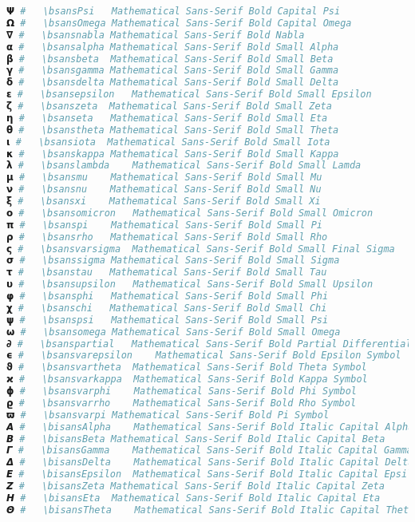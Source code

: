 \begin{lstlisting}[language=Julia, style=julia]
𝝭 #   \bsansPsi   Mathematical Sans-Serif Bold Capital Psi
𝝮 #   \bsansOmega Mathematical Sans-Serif Bold Capital Omega
𝝯 #   \bsansnabla Mathematical Sans-Serif Bold Nabla
𝝰 #   \bsansalpha Mathematical Sans-Serif Bold Small Alpha
𝝱 #   \bsansbeta  Mathematical Sans-Serif Bold Small Beta
𝝲 #   \bsansgamma Mathematical Sans-Serif Bold Small Gamma
𝝳 #   \bsansdelta Mathematical Sans-Serif Bold Small Delta
𝝴 #   \bsansepsilon   Mathematical Sans-Serif Bold Small Epsilon
𝝵 #   \bsanszeta  Mathematical Sans-Serif Bold Small Zeta
𝝶 #   \bsanseta   Mathematical Sans-Serif Bold Small Eta
𝝷 #   \bsanstheta Mathematical Sans-Serif Bold Small Theta
𝝸 #   \bsansiota  Mathematical Sans-Serif Bold Small Iota
𝝹 #   \bsanskappa Mathematical Sans-Serif Bold Small Kappa
𝝺 #   \bsanslambda    Mathematical Sans-Serif Bold Small Lamda
𝝻 #   \bsansmu    Mathematical Sans-Serif Bold Small Mu
𝝼 #   \bsansnu    Mathematical Sans-Serif Bold Small Nu
𝝽 #   \bsansxi    Mathematical Sans-Serif Bold Small Xi
𝝾 #   \bsansomicron   Mathematical Sans-Serif Bold Small Omicron
𝝿 #   \bsanspi    Mathematical Sans-Serif Bold Small Pi
𝞀 #   \bsansrho   Mathematical Sans-Serif Bold Small Rho
𝞁 #   \bsansvarsigma  Mathematical Sans-Serif Bold Small Final Sigma
𝞂 #   \bsanssigma Mathematical Sans-Serif Bold Small Sigma
𝞃 #   \bsanstau   Mathematical Sans-Serif Bold Small Tau
𝞄 #   \bsansupsilon   Mathematical Sans-Serif Bold Small Upsilon
𝞅 #   \bsansphi   Mathematical Sans-Serif Bold Small Phi
𝞆 #   \bsanschi   Mathematical Sans-Serif Bold Small Chi
𝞇 #   \bsanspsi   Mathematical Sans-Serif Bold Small Psi
𝞈 #   \bsansomega Mathematical Sans-Serif Bold Small Omega
𝞉 #   \bsanspartial   Mathematical Sans-Serif Bold Partial Differential
𝞊 #   \bsansvarepsilon    Mathematical Sans-Serif Bold Epsilon Symbol
𝞋 #   \bsansvartheta  Mathematical Sans-Serif Bold Theta Symbol
𝞌 #   \bsansvarkappa  Mathematical Sans-Serif Bold Kappa Symbol
𝞍 #   \bsansvarphi    Mathematical Sans-Serif Bold Phi Symbol
𝞎 #   \bsansvarrho    Mathematical Sans-Serif Bold Rho Symbol
𝞏 #   \bsansvarpi Mathematical Sans-Serif Bold Pi Symbol
𝞐 #   \bisansAlpha    Mathematical Sans-Serif Bold Italic Capital Alpha
𝞑 #   \bisansBeta Mathematical Sans-Serif Bold Italic Capital Beta
𝞒 #   \bisansGamma    Mathematical Sans-Serif Bold Italic Capital Gamma
𝞓 #   \bisansDelta    Mathematical Sans-Serif Bold Italic Capital Delta
𝞔 #   \bisansEpsilon  Mathematical Sans-Serif Bold Italic Capital Epsilon
𝞕 #   \bisansZeta Mathematical Sans-Serif Bold Italic Capital Zeta
𝞖 #   \bisansEta  Mathematical Sans-Serif Bold Italic Capital Eta
𝞗 #   \bisansTheta    Mathematical Sans-Serif Bold Italic Capital Theta

\end{lstlisting}
